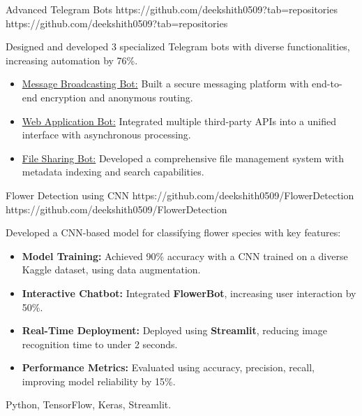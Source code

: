 \documentclass[a4paper,10pt]{article}
\begin{document}
\projectentry
{Advanced Telegram Bots}
{https://github.com/deekshith0509?tab=repositories}
{https://github.com/deekshith0509?tab=repositories}
{Designed and developed 3 specialized Telegram bots with diverse functionalities, increasing automation by 76\%.
\begin{itemize}
    \vspace{2pt}
    \item \href{https://github.com/deekshith0509/MessageBroadcasting_Bot}{Message Broadcasting Bot:} Built a secure messaging platform with end-to-end encryption and anonymous routing.
    \vspace{2pt}
    \item \href{https://github.com/deekshith0509/WebApplication_Bot}{Web Application Bot:} Integrated multiple third-party APIs into a unified interface with asynchronous processing.
    \vspace{2pt}
    \item \href{https://github.com/deekshith0509/Fileforwardbot}{File Sharing Bot:} Developed a comprehensive file management system with metadata indexing and search capabilities.
\end{itemize}  
}





\vspace{10pt}

\iffalse  %
\projectentry
{Flower Detection using CNN}
{https://github.com/deekshith0509/FlowerDetection}
{https://github.com/deekshith0509/FlowerDetection}
{Developed a CNN-based model for classifying flower species with key features:
\begin{itemize}
\item \textbf{Model Training:} Achieved 90\% accuracy with a CNN trained on a diverse Kaggle dataset, using data augmentation.
    \item \textbf{Interactive Chatbot:} Integrated \textbf{FlowerBot}, increasing user interaction by 50\%.
    \item \textbf{Real-Time Deployment:} Deployed using \textbf{Streamlit}, reducing image recognition time to under 2 seconds.
    \item \textbf{Performance Metrics:} Evaluated using accuracy, precision, recall, improving model reliability by 15\%.
\end{itemize}
}
{Python, TensorFlow, Keras, Streamlit.}

\vspace{10pt}
\end{document}
